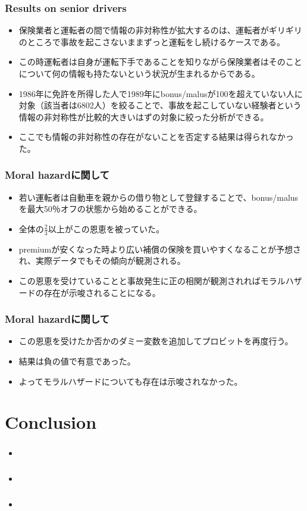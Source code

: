 \documentclass[dvipdfmx, 12pt]{beamer}
\begin{document}
\begin{frame}\frametitle{Results on senior drivers}
	\begin{itemize}
	\item 保険業者と運転者の間で情報の非対称性が拡大するのは、運転者がギリギリのところで事故を起こさないままずっと運転をし続けるケースである。
	\item この時運転者は自身が運転下手であることを知りながら保険業者はそのことについて何の情報も持たないという状況が生まれるからである。
	\item 1986年に免許を所得した人で1989年にbonus/malusが100を超えていない人に対象（該当者は6802人）を絞ることで、事故を起こしていない経験者という情報の非対称性が比較的大きいはずの対象に絞った分析ができる。
	\item ここでも情報の非対称性の存在がないことを否定する結果は得られなかった。
	\end{itemize}
\end{frame}

\begin{frame}\frametitle{Moral hazardに関して}
	\begin{itemize}
	\item 若い運転者は自動車を親からの借り物として登録することで、bonus/malusを最大50％オフの状態から始めることができる。
	\item 全体の$\frac{2}{3}$以上がこの恩恵を被っていた。
	\item premiumが安くなった時より広い補償の保険を買いやすくなることが予想され、実際データでもその傾向が観測される。
	\item この恩恵を受けていることと事故発生に正の相関が観測されればモラルハザードの存在が示唆されることになる。
	\end{itemize}
\end{frame}

\begin{frame}\frametitle{Moral hazardに関して}
	\begin{itemize}
	\item この恩恵を受けたか否かのダミー変数を追加してプロビットを再度行う。
	\item 結果は負の値で有意であった。
	\item よってモラルハザードについても存在は示唆されなかった。
	\end{itemize}
\end{frame}

\section{Conclusion}
\begin{frame}\frametitle{}
	\begin{itemize}
	\item 
	\end{itemize}
\end{frame}

\begin{frame}\frametitle{}
	\begin{itemize}
	\item 
	\end{itemize}
\end{frame}

\begin{frame}\frametitle{}
	\begin{itemize}
	\item 
	\end{itemize}
\end{frame}
\end{document}
